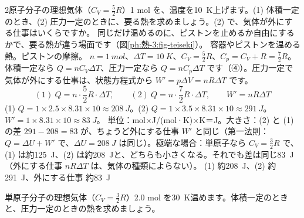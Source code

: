 \begin{phreidai}[定積と定圧で温める熱]
\label{ph:熱-3:ex8}2原子分子の理想気体（$C_V=\tfrac{5}{2}R$）1 mol を、温度を\qty{10}{K}上げます。(1) 体積一定のとき、(2) 圧力一定のときに、要る熱を求めましょう。(2) で、気体が外にする仕事はいくらですか。
\phbamen
同じだけ温めるのに、ピストンを止めるか自由にするかで、要る熱が違う場面です（図\ref{ph:熱-3:fig-teiseki}）。
\phmushi
容器やピストンを温める熱。ピストンの摩擦。
\phzu
$n=\qty{1}{mol}$、$\Delta T=\qty{10}{K}$、$C_V=\tfrac{5}{2}R$、$C_p=C_V+R=\tfrac{7}{2}R$。
\phriyu
体積一定なら $Q=nC_V\Delta T$、圧力一定なら $Q=nC_p\Delta T$ です（④）。圧力一定で気体が外にする仕事は、状態方程式から $W'=p\Delta V=nR\Delta T$ です。
\phtateru
\[ (1)\ Q=n\cdot\frac{5}{2}R\cdot\Delta T,\qquad (2)\ Q=n\cdot\frac{7}{2}R\cdot\Delta T,\qquad W'=nR\Delta T \]
\phtoku
(1) $Q=1\times2.5\times8.31\times10\approx\qty{208}{J}$。(2) $Q=1\times3.5\times8.31\times10\approx\qty{291}{J}$。$W'=1\times8.31\times10\approx\qty{83}{J}$。
\phtashikame
単位：mol×J/(mol·K)×K＝J。大きさ：(2) と (1) の差 $291-208=83$ が、ちょうど外にする仕事 $W'$ と同じ（第一法則：$Q=\Delta U+W'$ で、$\Delta U=\qty{208}{J}$ は同じ）。極端な場合：単原子なら $C_V=\tfrac32R$ で、(1) は約\qty{125}{J}、(2) は約\qty{208}{J}と、どちらも小さくなる。それでも差は同じ\qty{83}{J}（外にする仕事 $nR\Delta T$ は、気体の種類によらない）。
\kotae (1) 約\qty{208}{J}、(2) 約\qty{291}{J}、外にする仕事 約\qty{83}{J}
\end{phreidai}
\begin{jibun}
単原子分子の理想気体（$C_V=\tfrac{3}{2}R$）2.0 mol を\qty{30}{K}温めます。体積一定のときと、圧力一定のときの熱を求めましょう。
\end{jibun}

